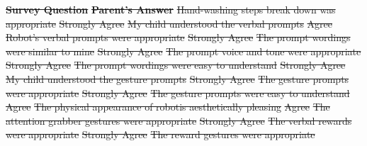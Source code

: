 \documentclass{ut-thesis}
\providecommand{\DIFdeltex}[1]{{\protect\color{red}\sout{#1}}}                      %
\providecommand{\DIFdelFL}[1]{\DIFdel{#1}} %
\providecommand{\DIFdel}[1]{\texorpdfstring{\DIFdeltex{#1}}{}} %
\begin{document}
\textbf{\DIFdelFL{Survey Question}}	%
\textbf{\DIFdelFL{Parent's Answer}}	%
\DIFdelFL{Hand-washing steps break down was appropriate	}%
\DIFdelFL{Strongly Agree	}%
\DIFdelFL{My child understood the verbal prompts	}%
\DIFdelFL{Agree	}%
\DIFdelFL{Robot's verbal prompts were appropriate	}%
\DIFdelFL{Strongly Agree	}%
\DIFdelFL{The prompt wordings were similar to mine	}%
\DIFdelFL{Strongly Agree	}%
\DIFdelFL{The prompt voice and tone were appropriate	}%
\DIFdelFL{Strongly Agree	}%
\DIFdelFL{The prompt wordings were easy to understand	}%
\DIFdelFL{Strongly Agree }%
\DIFdelFL{My child understood the gesture prompts	}%
\DIFdelFL{Strongly Agree	}%
\DIFdelFL{The gesture prompts were appropriate	}%
\DIFdelFL{Strongly Agree	}%
\DIFdelFL{The gesture prompts were easy to understand	}%
\DIFdelFL{Agree	}%
\DIFdelFL{The physical appearance of robotis aesthetically pleasing	}%
\DIFdelFL{Agree	}%
\DIFdelFL{The attention grabber gestures were appropriate	}%
\DIFdelFL{Strongly Agree	}%
\DIFdelFL{The verbal rewards were appropriate	}%
\DIFdelFL{Strongly Agree	}%
\DIFdelFL{The reward gestures were appropriate	}%
\end{document}
